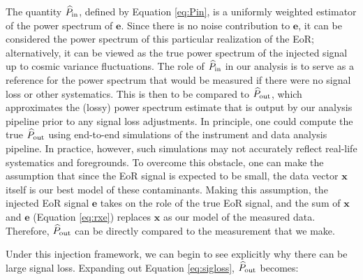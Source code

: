 \documentclass[preprint2,numberedappendix,tighten]{aastex6}  %
\newcommand{\phat}{\widehat{\mathbf{p}}}
\newcommand{\cc}[1]{{\color{purple} \textbf{[CC: #1]}}}
\begin{document}
The quantity $\widehat{P}_{\rm in}$, defined by Equation \eqref{eq:Pin}, is a uniformly weighted estimator of the power spectrum of $\mathbf{e}$. Since there is no noise contribution to $\mathbf{e}$, it can be considered the power spectrum of this particular realization of the EoR; alternatively, it can be viewed as the true power spectrum of the injected signal up to cosmic variance fluctuations. The role of $\widehat{P}_{\rm in}$ in our analysis is to serve as a reference for the power spectrum that would be measured if there were no signal loss or other systematics. This is then to be compared to $\widehat{P}_{\rm out}$, which approximates the (lossy) power spectrum estimate that is output by our analysis pipeline prior to any signal loss adjustments. In principle, one could compute the true $\widehat{P}_{\rm out}$ using end-to-end simulations of the instrument and data analysis pipeline. In practice, however, such simulations may not accurately reflect real-life systematics and foregrounds. To overcome this obstacle, one can make the assumption that since the EoR signal is expected to be small, the data vector $\mathbf{x}$ itself is our best model of these contaminants. Making this assumption, the injected EoR signal $\mathbf{e}$ takes on the role of the true EoR signal, and the sum of $\mathbf{x}$ and $\mathbf{e}$ (Equation \eqref{eq:rxe}) replaces $\mathbf{x}$ as our model of the measured data. Therefore, $\widehat{P}_{\rm out}$ can be directly compared to the measurement that we make.



Under this injection framework, we can begin to see explicitly why there can be large signal loss. Expanding out Equation \eqref{eq:sigloss}, $\widehat{P}_{\rm out}$ becomes:
\end{document}
